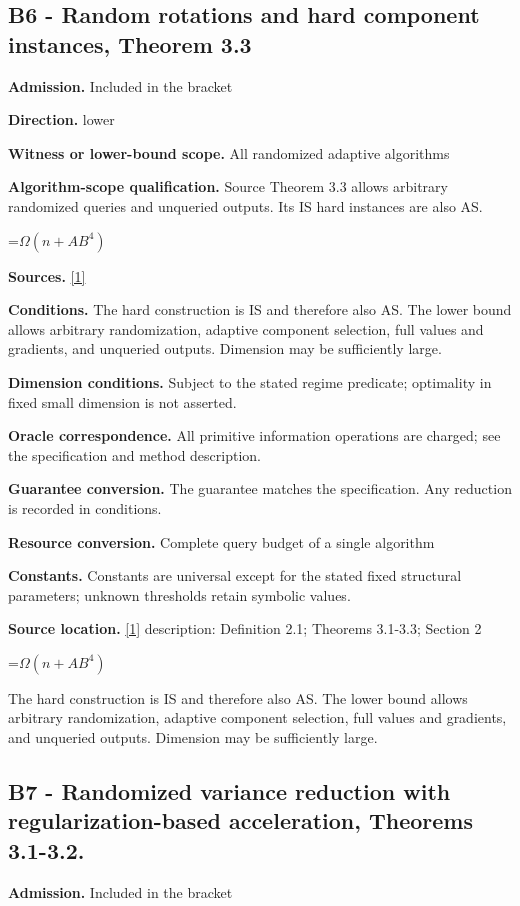 \documentclass[10pt,a4paper]{article}
\newcommand{\AtlasMath}[1]{\par\begingroup\centering\setbox0=\hbox{$\displaystyle #1$}\ifdim\wd0>1.4\linewidth\typeout{ATLAS WIDE FORMULA: \the\wd0}\fi\ifdim\wd0>\linewidth\resizebox{\linewidth}{!}{\box0}\else\box0\fi\par\endgroup}
\begin{document}
\subsection{B6 - Random rotations and hard component instances, Theorem 3.3}
\textbf{Admission.} Included in the bracket

\textbf{Direction.} lower

\textbf{Witness or lower-bound scope.} All randomized adaptive algorithms

\textbf{Algorithm-scope qualification.} Source Theorem 3.3 allows arbitrary randomized queries and unqueried outputs. Its IS hard instances are also AS.

\AtlasMath{\Omega(n+AB^4)}
\textbf{Sources.} \href{https://arxiv.org/pdf/2610.16991v2}{[1]}

\textbf{Conditions.} The hard construction is IS and therefore also AS. The lower bound allows arbitrary randomization, adaptive component selection, full values and gradients, and unqueried outputs. Dimension may be sufficiently large.

\textbf{Dimension conditions.} Subject to the stated regime predicate; optimality in fixed small dimension is not asserted.

\textbf{Oracle correspondence.} All primitive information operations are charged; see the specification and method description.

\textbf{Guarantee conversion.} The guarantee matches the specification. Any reduction is recorded in conditions.

\textbf{Resource conversion.} Complete query budget of a single algorithm

\textbf{Constants.} Constants are universal except for the stated fixed structural parameters; unknown thresholds retain symbolic values.

\textbf{Source location.} \href{https://arxiv.org/pdf/2610.16991v2}{[1]} description: Definition 2.1; Theorems 3.1-3.3; Section 2

\AtlasMath{\Omega(n+AB^4)}
The hard construction is IS and therefore also AS. The lower bound allows arbitrary randomization, adaptive component selection, full values and gradients, and unqueried outputs. Dimension may be sufficiently large.

\subsection{B7 - Randomized variance reduction with regularization-based acceleration, Theorems 3.1-3.2.}
\textbf{Admission.} Included in the bracket
\end{document}
